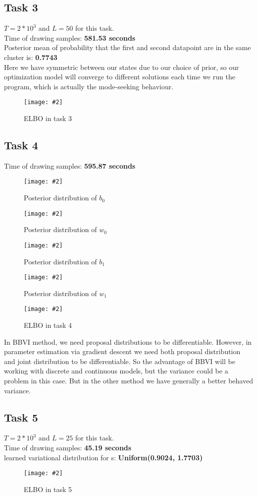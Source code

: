 \documentclass{article}
\def\gre#1{{\color{gre}#1}}
\newcommand{\centerfigcap}[3]{\begin{figure}[H]
\begin{center}\texttt{[image: \#2]} \caption{#3}\end{center}
\end{figure}}
\begin{document}
\subsection{Task 3}
$T = 2*10^3$ and $L = 50$ for this task.\\
Time of drawing samples: \textbf{581.53 seconds}\\
Posterior mean of probability that the first and second datapoint are in the same cluster is: \textbf{0.7743}\\
\gre{Here we have symmetric between our states due to our choice of prior, so our optimization model will converge to different solutions each time we run the program,  which is actually the mode-seeking behaviour.}
\centerfigcap{0.7}{../figures/ELBO_3}{ELBO in task 3}
\subsection{Task 4}
Time of drawing samples: \textbf{595.87 seconds}\\
\centerfigcap{0.6}{../figures/BBVI_plt_hitmap_program_4_b0}{Posterior distribution of $b_0$}
\centerfigcap{0.6}{../figures/BBVI_plt_hitmap_program_4_w0}{Posterior distribution of $w_0$}
\centerfigcap{0.6}{../figures/BBVI_plt_hitmap_program_4_b1}{Posterior distribution of $b_1$}
\centerfigcap{0.6}{../figures/BBVI_plt_hitmap_program_4_w1}{Posterior distribution of $w_1$}
\centerfigcap{1}{../figures/ELBO_4}{ELBO in task 4}
\gre{In BBVI method, we need proposal distributions to be differentiable.  However, in parameter estimation via gradient descent we need both proposal distribution and joint distribution to be differentiable.  So the advantage of BBVI will be working with discrete and continuous models, but the variance could be a problem in this case.  But in the other method we have generally a better behaved variance.}


\subsection{Task 5}
$T = 2*10^3$ and $L = 25$ for this task.\\
Time of drawing samples: \textbf{45.19 seconds}\\
learned variational distribution for s: \textbf{Uniform(0.9024, 1.7703)} 
\centerfigcap{1}{../figures/ELBO_5}{ELBO in task 5}
\end{document}
